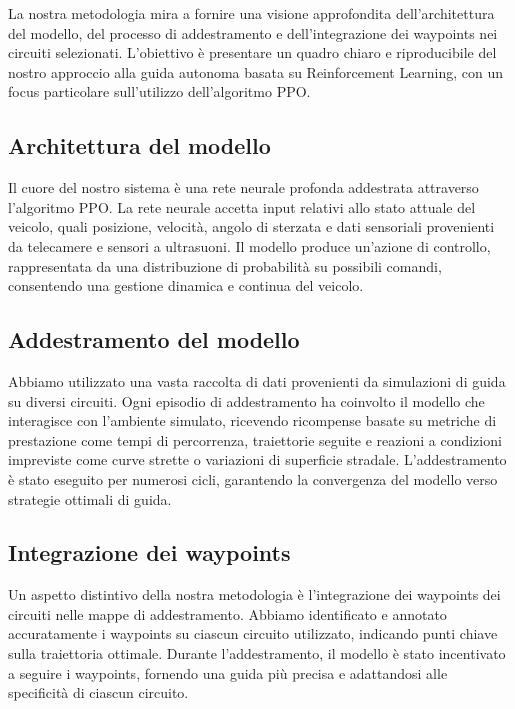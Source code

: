 \documentclass[conference]{IEEEtran}
\begin{document}



La nostra metodologia mira a fornire una visione approfondita dell'architettura del modello, del processo di addestramento e dell'integrazione dei waypoints nei circuiti selezionati. L'obiettivo è presentare un quadro chiaro e riproducibile del nostro approccio alla guida autonoma basata su Reinforcement Learning, con un focus particolare sull'utilizzo dell'algoritmo PPO.

\subsection{Architettura del modello}
Il cuore del nostro sistema è una rete neurale profonda addestrata attraverso l'algoritmo PPO. La rete neurale accetta input relativi allo stato attuale del veicolo, quali posizione, velocità, angolo di sterzata e dati sensoriali provenienti da telecamere e sensori a ultrasuoni. Il modello produce un'azione di controllo, rappresentata da una distribuzione di probabilità su possibili comandi, consentendo una gestione dinamica e continua del veicolo.

\subsection{Addestramento del modello}
Abbiamo utilizzato una vasta raccolta di dati provenienti da simulazioni di guida su diversi circuiti. Ogni episodio di addestramento ha coinvolto il modello che interagisce con l'ambiente simulato, ricevendo ricompense basate su metriche di prestazione come tempi di percorrenza, traiettorie seguite e reazioni a condizioni impreviste come curve strette o variazioni di superficie stradale. L'addestramento è stato eseguito per numerosi cicli, garantendo la convergenza del modello verso strategie ottimali di guida.

\subsection{Integrazione dei waypoints}

Un aspetto distintivo della nostra metodologia è l'integrazione dei waypoints dei circuiti nelle mappe di addestramento.
%
Abbiamo identificato e annotato accuratamente i waypoints su ciascun circuito utilizzato, indicando punti chiave sulla traiettoria ottimale.
%
Durante l'addestramento, il modello è stato incentivato a seguire i waypoints, fornendo una guida più precisa e adattandosi alle specificità di ciascun circuito.
\end{document}
